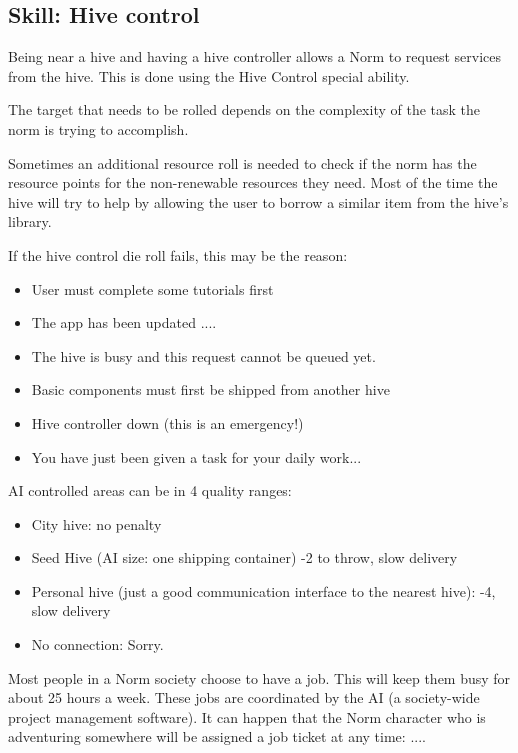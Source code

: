 \subsection{Skill: Hive control}
\label{sec:Hive control skill}

Being near a hive and having a hive controller allows a Norm to request services from the hive. This is done using the Hive Control special ability.

The target that needs to be rolled depends on the complexity of the task the norm is trying to accomplish.

Sometimes an additional resource roll is needed to check if the norm has the resource points for the non-renewable resources they need. Most of the time the hive will try to help by allowing the user to borrow a similar item from the hive's library.

If the hive control die roll fails, this may be the reason:
\begin{itemize}
    \item User must complete some tutorials first
    \item The app has been updated ....
    \item The hive is busy and this request cannot be queued yet.
    \item Basic components must first be shipped from another hive
    \item Hive controller down (this is an emergency!)
    \item You have just been given a task for your daily work...
\end{itemize}

AI controlled areas can be in 4 quality ranges:

\begin{itemize}
    \item City hive: no penalty
    \item Seed Hive (AI size: one shipping container) -2 to throw, slow delivery
    \item Personal hive (just a good communication interface to the nearest hive): -4, slow delivery
    \item No connection: Sorry.
\end{itemize}

Most people in a Norm society choose to have a job. This will keep them busy for about 25 hours a week. These jobs are coordinated by the AI (a society-wide project management software). It can happen that the Norm character who is adventuring somewhere will be assigned a job ticket at any time: ....

